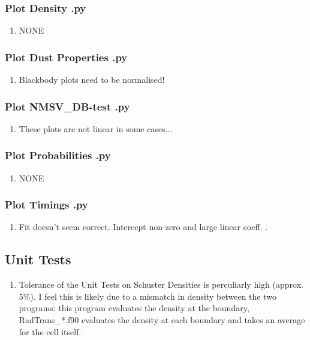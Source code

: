 \subsubsection{Plot Density .py}
\begin{enumerate}
    \item  NONE
\end{enumerate}

\subsubsection{Plot Dust Properties .py}
\begin{enumerate}
    \item  Blackbody plots need to be normalised!
\end{enumerate}

\subsubsection{Plot NMSV\_DB-test  .py}
\begin{enumerate}
    \item  These plots are not linear in some cases...
\end{enumerate}

\subsubsection{Plot Probabilities .py}
\begin{enumerate}
    \item  NONE
\end{enumerate}

\subsubsection{Plot Timings .py}
\begin{enumerate}
    \item  Fit doesn't seem correct. Intercept non-zero and large linear coeff. .
\end{enumerate}

\subsection{Unit Tests}
\begin{enumerate}
    \item      Tolerance of the Unit Tests on Schuster Densities is perculiarly high (approx. 5\%). I feel this is likely due to a mismatch in density between the two programs:
    this program evaluates the density at the boundary, RadTrans\_*.f90 evaluates
    the density at each boundary and takes an average for the cell itself.
\end{enumerate}
